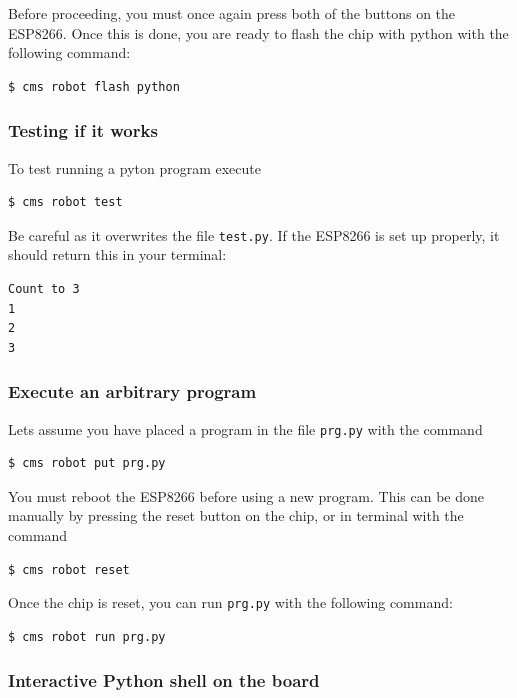 Before proceeding, you must once again press both of the buttons on the
ESP8266. Once this is done, you are ready to flash the chip with python
with the following command:

\begin{verbatim}
$ cms robot flash python 
\end{verbatim}

\subsubsection{Testing if it works}\label{testing-if-it-works}

To test running a pyton program execute

\begin{verbatim}
$ cms robot test
\end{verbatim}

Be careful as it overwrites the file \texttt{test.py}. If the ESP8266 is
set up properly, it should return this in your terminal:

\begin{verbatim}
Count to 3
1
2
3
\end{verbatim}

\subsubsection{Execute an arbitrary
program}\label{execute-an-arbitrary-program}

Lets assume you have placed a program in the file \texttt{prg.py} with
the command

\begin{verbatim}
$ cms robot put prg.py  
\end{verbatim}

You must reboot the ESP8266 before using a new program. This can be done
manually by pressing the reset button on the chip, or in terminal with
the command

\begin{verbatim}
$ cms robot reset
\end{verbatim}

Once the chip is reset, you can run \texttt{prg.py} with the following
command:

\begin{verbatim}
$ cms robot run prg.py
\end{verbatim}

\subsubsection{Interactive Python shell on the
board}\label{interactive-python-shell-on-the-board}

